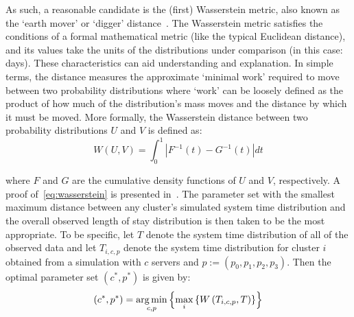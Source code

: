 As such, a reasonable candidate is the (first) Wasserstein metric, also known as
the `earth mover' or `digger' distance~\cite{Vaserstein1969}. The Wasserstein
metric satisfies the conditions of a formal mathematical metric (like the
typical Euclidean distance), and its values take the units of the distributions
under comparison (in this case: days). These characteristics can aid
understanding and explanation. In simple terms, the distance measures the
approximate `minimal work' required to move between two probability
distributions where `work' can be loosely defined as the product of how much of
the distribution's mass moves and the distance by which it must be moved. More
formally, the Wasserstein distance between two probability distributions \(U\)
and \(V\) is defined as:
\begin{equation}\label{eq:wasserstein}
    W(U, V) = \int_{0}^{1} \left\vert F^{-1}(t) - G^{-1}(t) \right\vert dt
\end{equation}

\noindent where \(F\) and \(G\) are the cumulative density functions of \(U\)
and \(V\), respectively. A proof of~\eqref{eq:wasserstein} is presented
in~\cite{Ramdas2017}. The parameter set with the smallest maximum distance
between any cluster's simulated system time distribution and the overall
observed length of stay distribution is then taken to be the most appropriate.
To be specific, let \(T\) denote the system time distribution of all of the
observed data and let \(T_{i,c,p}\) denote the system time distribution for
cluster \(i\) obtained from a simulation with \(c\) servers and \(p :=
\left(p_0, p_1, p_2, p_3\right)\). Then the optimal parameter set \(\left(c^*,
p^*\right)\) is given by:
\begin{equation}\label{eq:parameters}
    \left(c^*, p^*\right) = \argmin_{c, p} \left\{%
        \max_{i} \left\{ W\left(T_{i,c,p}, T\right) \right\}%
    \right\}
\end{equation}

